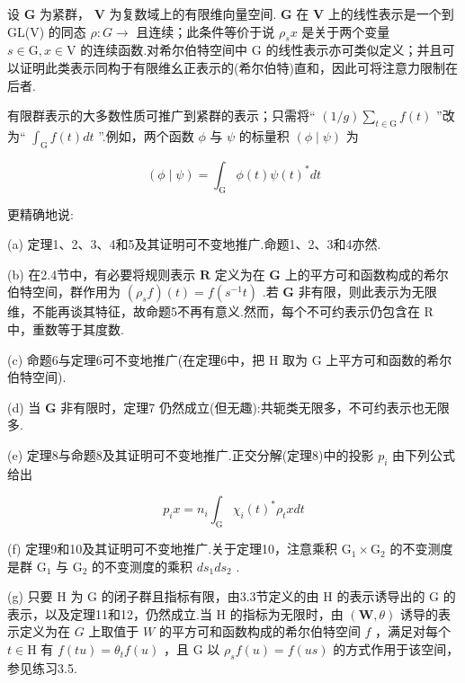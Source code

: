 \documentclass[10pt]{article}
\begin{document}
设 \(\mathbf{G}\) 为紧群， \(\mathbf{V}\) 为复数域上的有限维向量空间. \(\mathbf{G}\) 在 \(\mathbf{V}\) 上的线性表示是一个到 GL(V) 的同态 \(\rho  : G \rightarrow\) 且连续；此条件等价于说 \({\rho }_{s}x\) 是关于两个变量 \(s \in  \mathrm{G},x \in  \mathrm{V}\) 的连续函数.对希尔伯特空间中 \(\mathrm{G}\) 的线性表示亦可类似定义；并且可以证明此类表示同构于有限维幺正表示的(希尔伯特)直和，因此可将注意力限制在后者.

有限群表示的大多数性质可推广到紧群的表示；只需将“ \(\left( {1/g}\right) \mathop{\sum }\limits_{{t \in  \mathrm{G}}}f\left( t\right)\) ”改为“ \({\int }_{\mathrm{G}}f\left( t\right) {dt}\) ”.例如，两个函数 \(\phi\) 与 \(\psi\) 的标量积 \(\left( {\phi  \mid  \psi }\right)\) 为

\[
\left( {\phi  \mid  \psi }\right)  = {\int }_{\mathrm{G}}\phi \left( t\right) \psi {\left( t\right) }^{ * }{dt}
\]

更精确地说:

(a) 定理1、2、3、4和5及其证明可不变地推广.命题1、2、3和4亦然.

(b) 在2.4节中，有必要将规则表示 \(\mathbf{R}\) 定义为在 \(\mathbf{G}\) 上的平方可和函数构成的希尔伯特空间，群作用为 \(\left( {{\rho }_{s}f}\right) \left( t\right)  = f\left( {{s}^{-1}t}\right)\) .若 \(\mathbf{G}\) 非有限，则此表示为无限维，不能再谈其特征，故命题5不再有意义.然而，每个不可约表示仍包含在 \(\mathrm{R}\) 中，重数等于其度数.

(c) 命题6与定理6可不变地推广(在定理6中，把 H 取为 G 上平方可和函数的希尔伯特空间).

(d) 当 \(\mathbf{G}\) 非有限时，定理7 仍然成立(但无趣):共轭类无限多，不可约表示也无限多.

(e) 定理8与命题8及其证明可不变地推广.正交分解(定理8)中的投影 \({p}_{i}\) 由下列公式给出

\[
{p}_{i}x = {n}_{i}{\int }_{\mathrm{G}}{\chi }_{i}{\left( t\right) }^{ * }{\rho }_{t}{xdt}
\]

(f) 定理9和10及其证明可不变地推广.关于定理10，注意乘积 \({\mathrm{G}}_{1} \times  {\mathrm{G}}_{2}\) 的不变测度是群 \({\mathrm{G}}_{1}\) 与 \({\mathrm{G}}_{2}\) 的不变测度的乘积 \(d{s}_{1}d{s}_{2}\) .

(g) 只要 \(\mathrm{H}\) 为 \(\mathrm{G}\) 的闭子群且指标有限，由3.3节定义的由 \(\mathrm{H}\) 的表示诱导出的 \(\mathrm{G}\) 的表示，以及定理11和12，仍然成立.当 H 的指标为无限时，由 \(\left( {\mathbf{W},\theta }\right)\) 诱导的表示定义为在 \(G\) 上取值于 \(W\) 的平方可和函数构成的希尔伯特空间 \(f\) ，满足对每个 \(t \in  \mathrm{H}\) 有 \(f\left( {tu}\right)  = {\theta }_{t}f\left( u\right)\) ，且 \(\mathrm{G}\) 以 \({\rho }_{s}f\left( u\right)  = f\left( {us}\right)\) 的方式作用于该空间，参见练习3.5.
\end{document}
